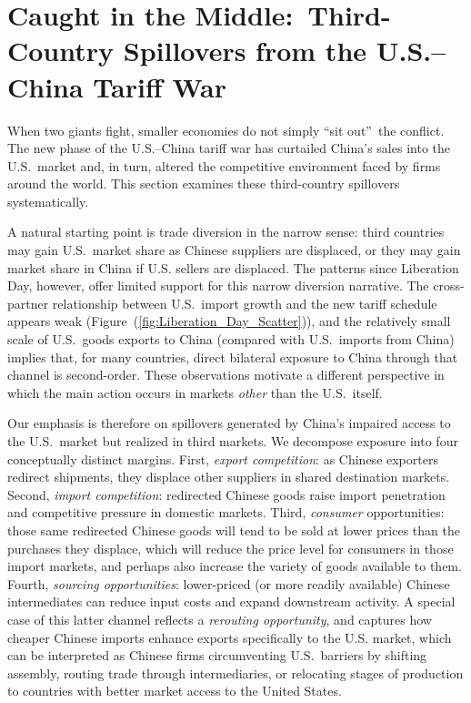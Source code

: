\documentclass[english,12pt]{article}
\theoremstyle{definition}
\let\oldref\ref
\renewcommand{\ref}[1]{(\oldref{#1})}
\begin{document}
\section{Caught in the Middle:\ Third-Country Spillovers from the
U.S.--China Tariff War \label{Sec: Third Countries}}

When two giants fight, smaller economies do not simply \textquotedblleft sit
out\textquotedblright\ the conflict. The new phase of the U.S.--China tariff
war has curtailed China's sales into the U.S.\ market and, in turn, altered
the competitive environment faced by firms around the world. This section
examines these third-country spillovers systematically.

A natural starting point is trade diversion in the narrow sense: third
countries may gain U.S.\ market share as Chinese suppliers are displaced, or
they may gain market share in China if U.S. sellers are displaced. The
patterns since Liberation Day, however, offer limited support for this
narrow diversion narrative. The cross-partner relationship between U.S.\
import growth and the new tariff schedule appears weak (Figure\ \ref%
{fig:Liberation_Day_Scatter}), and the relatively small scale of U.S.\ goods
exports to China (compared with U.S.\ imports from China) implies that, for
many countries, direct bilateral exposure to China through that channel is
second-order. These observations motivate a different perspective in which
the main action occurs in markets \emph{other} than the U.S.\ itself.

Our emphasis is therefore on spillovers generated by China's impaired access
to the U.S.\ market but realized in third markets. We decompose exposure
into four conceptually distinct margins. First, \emph{export competition}:
as Chinese exporters redirect shipments, they displace other suppliers in
shared destination markets. Second, \emph{import competition}: redirected
Chinese goods raise import penetration and competitive pressure in domestic
markets. Third, \emph{consumer} opportunities: those same redirected
Chinese goods will tend to be sold at lower prices than the purchases they
displace, which will reduce the price level for consumers in those import
markets, and perhaps also increase the variety of goods available to them.
Fourth, \emph{sourcing opportunities}: lower-priced (or more readily
available) Chinese intermediates can reduce input costs and expand
downstream activity. A special case of this latter channel reflects a 
\emph{rerouting opportunity}, and captures how cheaper Chinese imports enhance
exports specifically to the U.S. market, which can be interpreted as Chinese
firms circumventing U.S.\ barriers by shifting assembly, routing trade
through intermediaries, or relocating stages of production to countries
with better market access to the United States.
\end{document}
